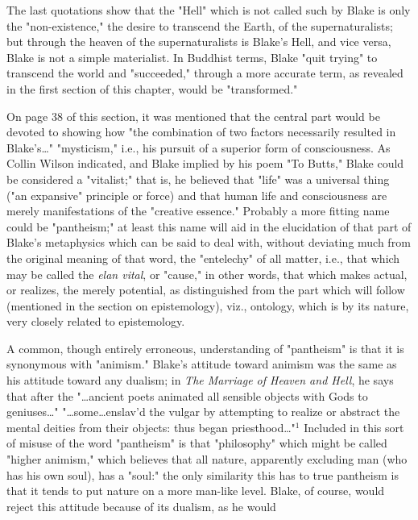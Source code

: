 The last quotations show that the "Hell" which is not called such by Blake is only the 
"non-existence," the desire to transcend the Earth, of the supernaturalists; but through the
heaven of the supernaturalists is Blake's Hell, and vice versa, Blake is not a simple materialist. In Buddhist terms,
Blake "quit trying" to transcend the world and "succeeded," through a more accurate term,
as revealed in the first section of this chapter, would be "transformed."\par
\vspace*{0.5\baselineskip}
On page 38 of this section, it was mentioned that the central part would be devoted
to showing how "the combination of two factors necessarily resulted in Blake's\dots" "mysticism," i.e., his
pursuit of a superior form of consciousness. As Collin Wilson indicated, and Blake implied by
his poem "To Butts," Blake could be considered a "vitalist;" that is, he believed that "life" was a universal
thing ("an expansive" principle or force) and that human life and consciousness are merely
manifestations of the "creative essence." Probably a more fitting name could be "pantheism;" at least
this name will aid in the elucidation of that part of Blake's metaphysics which can be said to deal with,
without deviating much from the original meaning of that word, the "entelechy" of all matter, i.e., that
which may be called the \textit{elan vital}, or "cause," in other words, that which makes actual,
or realizes, the merely potential, as distinguished from the part which will follow (mentioned in the section on
epistemology), viz., ontology, which is by its nature, very closely related to epistemology.\par
\vspace*{0.5\baselineskip}
A common, though entirely erroneous, understanding of "pantheism" is that it is synonymous with "animism." Blake's
attitude toward animism was the same as his attitude toward any dualism; in \textit{The Marriage of Heaven and Hell}, he says
that after the "\dots ancient poets animated all sensible objects with Gods to geniuses\dots" "\dots some\dots enslav'd the vulgar 
by attempting to realize or abstract the mental deities from their objects: thus began priesthood\dots"$^{1}$ Included in this sort of misuse
of the word "pantheism" is that "philosophy" which might be called "higher animism," which believes that all nature,
apparently excluding man (who has his own soul), has a "soul:" the only similarity this has to true pantheism is that it
tends to put nature on a more man-like level. Blake, of course, would reject this attitude because of its dualism, as he would
